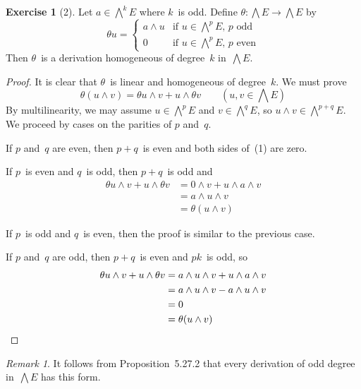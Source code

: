 \documentclass[letterpaper,12pt]{article}
\newcommand{\eprod}{\wedge}
\newcommand{\bigeprod}{\bigwedge}
\newcommand{\medeprod}{{\textstyle\bigeprod}}
\theoremstyle{definition}
\newtheorem*{exer}{Exercise}
\theoremstyle{remark}
\newtheorem*{rmk}{Remark}
\begin{document}
\begin{exer}[2]
Let \(a\in\medeprod^k E\) where \(k\)~is odd. Define \(\theta:\medeprod E\to\medeprod E\) by
\[\theta u=\begin{cases}
a\eprod u&\text{if \(u\in\medeprod^p E\), \(p\)~odd}\\
0&\text{if \(u\in\medeprod^p E\), \(p\)~even}
\end{cases}\]
Then \(\theta\)~is a derivation homogeneous of degree~\(k\) in~\(\medeprod E\).
\end{exer}
\begin{proof}
It is clear that \(\theta\)~is linear and homogeneous of degree~\(k\). We must prove
\[\theta(u\eprod v)=\theta u\eprod v+u\eprod\theta v\qquad(u,v\in\medeprod E)\tag{1}\]
By multilinearity, we may assume \(u\in\medeprod^p E\) and \(v\in\medeprod^q E\), so \(u\eprod v\in\medeprod^{p+q}E\). We proceed by cases on the parities of \(p\) and~\(q\).

If \(p\) and~\(q\) are even, then \(p+q\)~is even and both sides of~(1) are zero.

If \(p\)~is even and \(q\)~is odd, then \(p+q\)~is odd and
\begin{align*}
\theta u\eprod v+u\eprod\theta v&=0\eprod v+u\eprod a\eprod v\\
	&=a\eprod u\eprod v\\
	&=\theta(u\eprod v)
\end{align*}

If \(p\)~is odd and \(q\)~is even, then the proof is similar to the previous case.

If \(p\) and~\(q\) are odd, then \(p+q\)~is even and \(pk\)~is odd, so
\begin{align*}
\theta u\eprod v+u\eprod\theta v&=a\eprod u\eprod v+u\eprod a\eprod v\\
	&=a\eprod u\eprod v-a\eprod u\eprod v\\
	&=0\\
	&=\theta(u\eprod v)\qedhere
\end{align*}
\end{proof}
\begin{rmk}
It follows from Proposition~5.27.2 that every derivation of odd degree in~\(\medeprod E\) has this form.
\end{rmk}
\end{document}
